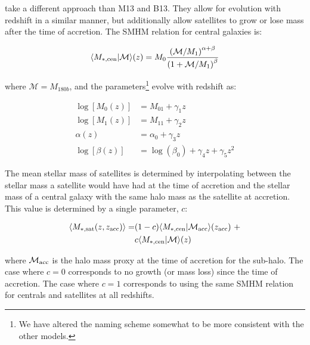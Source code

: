 \documentclass[a4paper,fleqn,usenatbib]{mnras}
\begin{document}
\cite{Yang:2012ew} take a different approach than M13 and B13.  They allow for evolution with redshift in a similar manner, but additionally allow satellites to grow or lose mass after the time of accretion.  The SMHM relation for central galaxies is: 
%
\begin{linenomath}
\begin{equation}
\langle M_{*,\rm cen} |  \mathcal{M} \rangle(z) = M_{0}\frac{\left( \mathcal{M}/M_1 \right)^{\alpha+\beta}}{\left(1+ \mathcal{M}/M_1 \right)^{\beta}}
\end{equation}  
\end{linenomath}
%
where $\mathcal{M}=M_{180b}$, and the parameters\footnote{We have altered the naming scheme somewhat to be more consistent with the other models.} evolve with redshift as:
%
\begin{linenomath}
\begin{align}
\log[M_{0}(z)] &= M_{01} + \gamma_1 z \\
\log[M_{1}(z)] &= M_{11} + \gamma_2 z \\
\alpha(z) &= \alpha_0 + \gamma_3 z \\
\log[\beta(z)] &= \log(\beta_0) + \gamma_4 z + \gamma_5 z^2
\end{align}
\end{linenomath}
%
The mean stellar mass of satellites is determined by interpolating between the stellar mass a satellite would have had at the time of accretion and the stellar mass of a central galaxy with the same halo mass as the satellite at accretion.  This value is determined by a single parameter, $c$:
%
\begin{linenomath}
\begin{align}
\label{eq:y12sat_model}
\langle M_{*,\rm sat}(z, z_{\rm acc})\rangle =&  (1-c)\langle M_{*,\rm cen} |  \mathcal{M}_{\rm acc} \rangle(z_{\rm acc})~+ \\ \nonumber &  c\langle M_{*,\rm cen}|  \mathcal{M} \rangle(z)
\end{align}
\end{linenomath}
%
where $\mathcal{M}_{\rm acc}$ is the halo mass proxy at the time of accretion for the sub-halo.  The case where $c=0$ corresponds to no growth (or mass loss) since the time of accretion.  The case where $c=1$ corresponds to using the same SMHM relation for centrals and satellites at all redshifts.
\end{document}

